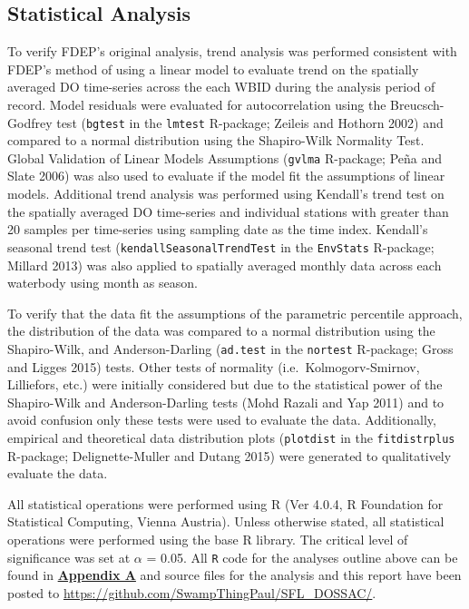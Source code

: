 \documentclass[]{interact}
\theoremstyle{plain}%
\theoremstyle{definition}
\theoremstyle{remark}
\begin{document}
\hypertarget{statistical-analysis}{%
\subsection{Statistical Analysis}\label{statistical-analysis}}

To verify FDEP's original analysis, trend analysis was performed
consistent with FDEP's method of using a linear model to evaluate trend
on the spatially averaged DO time-series across the each WBID during the
analysis period of record. Model residuals were evaluated for
autocorrelation using the Breucsch-Godfrey test (\texttt{bgtest} in the
\texttt{lmtest} R-package; Zeileis and Hothorn 2002) and compared to a
normal distribution using the Shapiro-Wilk Normality Test. Global
Validation of Linear Models Assumptions (\texttt{gvlma} R-package; Peña
and Slate 2006) was also used to evaluate if the model fit the
assumptions of linear models. Additional trend analysis was performed
using Kendall's trend test on the spatially averaged DO time-series and
individual stations with greater than 20 samples per time-series using
sampling date as the time index. Kendall's seasonal trend test
(\texttt{kendallSeasonalTrendTest} in the \texttt{EnvStats} R-package;
Millard 2013) was also applied to spatially averaged monthly data across
each waterbody using month as season.

To verify that the data fit the assumptions of the parametric percentile
approach, the distribution of the data was compared to a normal
distribution using the Shapiro-Wilk, and Anderson-Darling
(\texttt{ad.test} in the \texttt{nortest} R-package; Gross and Ligges
2015) tests. Other tests of normality (i.e.~Kolmogorv-Smirnov,
Lilliefors, etc.) were initially considered but due to the statistical
power of the Shapiro-Wilk and Anderson-Darling tests (Mohd Razali and
Yap 2011) and to avoid confusion only these tests were used to evaluate
the data. Additionally, empirical and theoretical data distribution
plots (\texttt{plotdist} in the \texttt{fitdistrplus} R-package;
Delignette-Muller and Dutang 2015) were generated to qualitatively
evaluate the data.

All statistical operations were performed using R (Ver 4.0.4, R
Foundation for Statistical Computing, Vienna Austria). Unless otherwise
stated, all statistical operations were performed using the base R
library. The critical level of significance was set at \(\alpha\) =
0.05. All \texttt{R} code for the analyses outline above can be found in
\textbf{\protect\hyperlink{appendix-a}{Appendix A}} and source files for
the analysis and this report have been posted to
\url{https://github.com/SwampThingPaul/SFL_DOSSAC/}.
\end{document}
